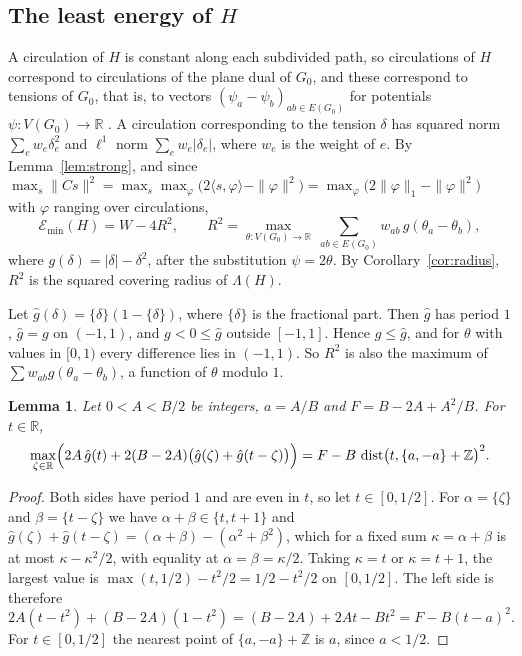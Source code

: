\documentclass[11pt]{amsart}
\newtheorem{lem}[thm]{Lemma}
\theoremstyle{definition}
\theoremstyle{remark}
\numberwithin{equation}{section}
\DeclareMathOperator{\dist}{dist}
\newcommand{\Emin}{\mathcal E_{\min}}
\newcommand{\Z}{\mathbb Z}
\newcommand{\R}{\mathbb R}
\begin{document}
\subsection{The least energy of \texorpdfstring{$H$}{H}}
A circulation of $H$ is constant along each subdivided path, so circulations of $H$ correspond to circulations of the plane dual of $G_0$, and these correspond to tensions of $G_0$, that is, to vectors $(\psi_a-\psi_b)_{ab\in E(G_0)}$ for potentials $\psi\colon V(G_0)\to\R$ \cite[Chapter~14]{GR01}. A circulation corresponding to the tension $\delta$ has squared norm $\sum_ew_e\delta_e^2$ and $\ell^1$ norm $\sum_ew_e|\delta_e|$, where $w_e$ is the weight of $e$. By Lemma~\ref{lem:strong}, and since $\max_s\|Cs\|^2=\max_s\max_{\varphi}\bigl(2\langle s,\varphi\rangle-\|\varphi\|^2\bigr)=\max_\varphi\bigl(2\|\varphi\|_1-\|\varphi\|^2\bigr)$ with $\varphi$ ranging over circulations,
\begin{equation}\label{eq:dual}
\Emin(H)=W-4R^2,\qquad R^2=\max_{\theta\colon V(G_0)\to\R}\ \sum_{ab\in E(G_0)}w_{ab}\,g(\theta_a-\theta_b),
\end{equation}
where $g(\delta)=|\delta|-\delta^2$, after the substitution $\psi=2\theta$. By Corollary~\ref{cor:radius}, $R^2$ is the squared covering radius of $\Lambda(H)$.

Let $\hat g(\delta)=\{\delta\}(1-\{\delta\})$, where $\{\delta\}$ is the fractional part. Then $\hat g$ has period $1$, $\hat g=g$ on $(-1,1)$, and $g<0\le\hat g$ outside $[-1,1]$. Hence $g\le\hat g$, and for $\theta$ with values in $[0,1)$ every difference lies in $(-1,1)$. So $R^2$ is also the maximum of $\sum w_{ab}\hat g(\theta_a-\theta_b)$, a function of $\theta$ modulo $1$.

\begin{lem}\label{lem:triangle}
Let $0<A<B/2$ be integers, $a=A/B$ and $F=B-2A+A^2/B$. For $t\in\R$,
\[
\max_{\zeta\in\R}\Bigl(2A\,\hat g(t)+2(B-2A)\bigl(\hat g(\zeta)+\hat g(t-\zeta)\bigr)\Bigr)=F-B\,\dist\bigl(t,\{a,-a\}+\Z\bigr)^2 .
\]
\end{lem}

\begin{proof}
Both sides have period $1$ and are even in $t$, so let $t\in[0,1/2]$. For $\alpha=\{\zeta\}$ and $\beta=\{t-\zeta\}$ we have $\alpha+\beta\in\{t,t+1\}$ and $\hat g(\zeta)+\hat g(t-\zeta)=(\alpha+\beta)-(\alpha^2+\beta^2)$, which for a fixed sum $\kappa=\alpha+\beta$ is at most $\kappa-\kappa^2/2$, with equality at $\alpha=\beta=\kappa/2$. Taking $\kappa=t$ or $\kappa=t+1$, the largest value is $\max(t,1/2)-t^2/2=1/2-t^2/2$ on $[0,1/2]$. The left side is therefore
\[
2A(t-t^2)+(B-2A)(1-t^2)=(B-2A)+2At-Bt^2=F-B(t-a)^2 .
\]
For $t\in[0,1/2]$ the nearest point of $\{a,-a\}+\Z$ is $a$, since $a<1/2$.
\end{proof}
\end{document}
